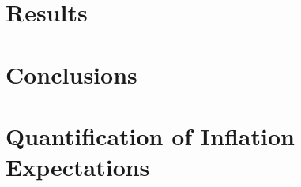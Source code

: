\documentclass[review]{elsarticle}
\begin{document}
\section{Results}\label{sec:Results}



\section{Conclusions} \label{sec:Conclusions}




\newpage

\appendix

\section{Quantification of Inflation Expectations}\label{sec:Quantification of Inflation Expectations}
\end{document}
